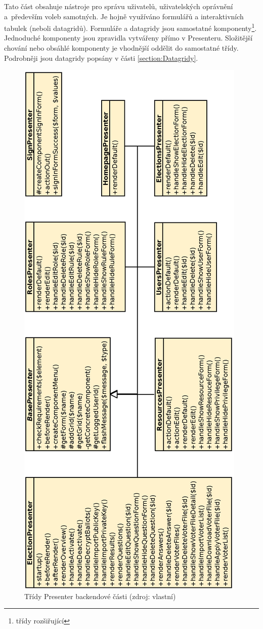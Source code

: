 

Tato část obsahuje nástroje pro správu uživatelů, uživatelských oprávnění a~především voleb samotných. Je hojně využíváno formulářů a interaktivních tabulek (neboli datagridů). Formuláře a datagridy jsou samostatné komponenty\footnote{třídy rozšiřující }. Jednoduché komponenty jsou zpravidla vytvářeny přímo v Presenteru. Složitější chování nebo obsáhlé komponenty je vhodnější oddělit do samostatné třídy. Podrobněji jsou datagridy popsány v části \ref{section:Datagridy}.

\begin{figure}[h]
	\centering
	\includegraphics[height=\textheight]{svg/backendPresentersPortrait.eps}
	\captionsetup{width=\linewidth}
	\caption[Třídy Presenter backendové části]{Třídy Presenter backendové části (zdroj: vlastní)}
	\label{fig:BackendPresenters}
\end{figure}
